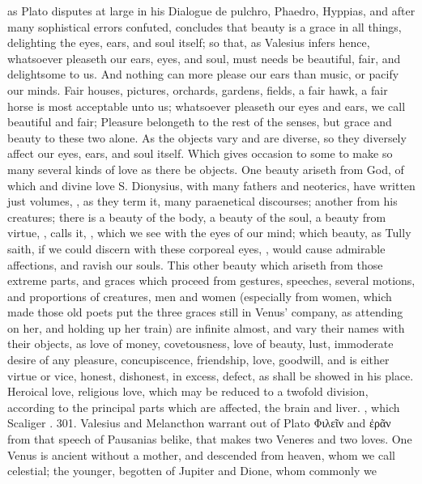 {as Plato disputes at large in his Dialogue de pulchro, Phaedro,
Hyppias, and after many sophistical errors confuted, concludes that
beauty is a grace in all things, delighting the eyes, ears, and soul
itself; so that, as Valesius infers hence, whatsoever pleaseth our
ears, eyes, and soul, must needs be beautiful, fair, and delightsome to
us. And nothing can more please our ears than music, or pacify
our minds. Fair houses, pictures, orchards, gardens, fields, a fair
hawk, a fair horse is most acceptable unto us; whatsoever pleaseth our
eyes and ears, we call beautiful and fair; Pleasure belongeth to
the rest of the senses, but grace and beauty to these two alone. As the
objects vary and are diverse, so they diversely affect our eyes, ears,
and soul itself. Which gives occasion to some to make so many several
kinds of love as there be objects. One beauty ariseth from God, of
which and divine love S. Dionysius, with many fathers and
neoterics, have written just volumes, , as they term it,
many paraenetical discourses; another from his creatures; there is a
beauty of the body, a beauty of the soul, a beauty from virtue, , \Austin{} calls it, , which we see with
the eyes of our mind; which beauty, as Tully saith, if we could discern
with these corporeal eyes, , would cause
admirable affections, and ravish our souls. This other beauty which
ariseth from those extreme parts, and graces which proceed from
gestures, speeches, several motions, and proportions of creatures, men
and women (especially from women, which made those old poets put the
three graces still in Venus' company, as attending on her, and holding
up her train) are infinite almost, and vary their names with their
objects, as love of money, covetousness, love of beauty, lust,
immoderate desire of any pleasure, concupiscence, friendship, love,
goodwill, \etc{} and is either virtue or vice, honest, dishonest, in
excess, defect, as shall be showed in his place. Heroical love,
religious love, \etc{} which may be reduced to a twofold division,
according to the principal parts which are affected, the brain and
liver. , which Scaliger . 301. Valesius and
Melancthon warrant out of Plato \textgreek{Φιλεῖν} and \textgreek{ἐρᾶν} from that speech of
Pausanias belike, that makes two Veneres and two loves. One Venus
is ancient without a mother, and descended from heaven, whom we call
celestial; the younger, begotten of Jupiter and Dione, whom commonly we
}

